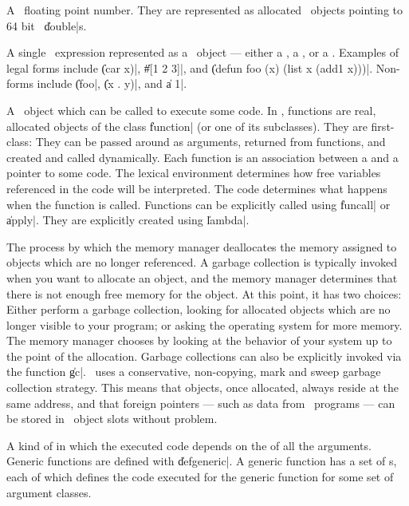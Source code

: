 \begin{description}
	{A \Talk\ floating point number.  They are represented as
	allocated \Talk\ objects pointing to 64 bit \langc\
	\|double|s.}

	{A single \Talk\ expression represented as a \Talk\ object ---
	either a , a , or a .
	Examples of legal forms include \|(car x)|, \|\#[1 2 3]|, and
	\|(defun foo (x) (list x (add1 x)))|.  Non-forms include
	\|(foo|, \|(x . y)|, and \|a 1|.}

	{A \Talk\ object which can be called to execute some code.  In
	\Talk, functions are real, allocated objects of the class
	\|function| (or one of its subclasses).  They are first-class:
	They can be passed around as arguments, returned from
	functions, and created and called dynamically.  Each function
	is an association between a  and a
	pointer to some code.  The lexical environment determines how
	free variables referenced in the code will be interpreted.
	The code determines what happens when the function is called.
	Functions can be explicitly called using \|funcall| or
	\|apply|.  They are explicitly created using \|lambda|.}

	{The process by which the memory manager deallocates the
	memory assigned to objects which are no longer referenced.  A
	garbage collection is typically invoked when you want to
	allocate an object, and the memory manager determines that
	there is not enough free memory for the object.  At this
	point, it has two choices: Either perform a garbage
	collection, looking for allocated objects which are no longer
	visible to your program; or asking the operating system for
	more memory.  The memory manager chooses by looking at the
	behavior of your system up to the point of the allocation.
	Garbage collections can also be explicitly invoked via the
	function \|gc|.  \IlogTalk\ uses a conservative, non-copying,
	mark and sweep garbage collection strategy.  This means that
	objects, once allocated, always reside at the same address,
	and that foreign pointers --- such as data from \langc\
	programs --- can be stored in \Talk\ object slots without
	problem.}

	{A kind of  in which the executed code depends
	on the \Gref{class} of all the arguments.  Generic functions
	are defined with \|defgeneric|.  A generic function has a set
	of \Gref{method}s, each of which defines the code executed for
	the generic function for some set of argument classes.}


\end{description}
